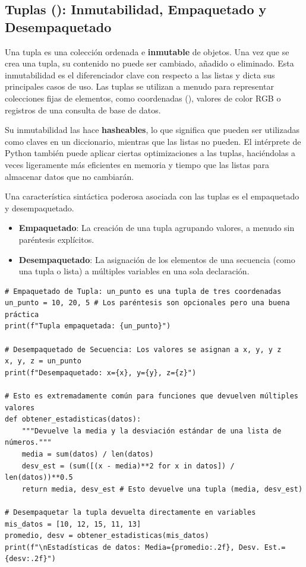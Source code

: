 \subsection{Tuplas (): Inmutabilidad, Empaquetado y Desempaquetado}
\label{subsec:tuples}
Una tupla es una colección ordenada e \textbf{inmutable} de objetos. Una vez que se crea una tupla, su contenido no puede ser cambiado, añadido o eliminado. Esta inmutabilidad es el diferenciador clave con respecto a las listas y dicta sus principales casos de uso. Las tuplas se utilizan a menudo para representar colecciones fijas de elementos, como coordenadas (), valores de color RGB o registros de una consulta de base de datos.

Su inmutabilidad las hace \textbf{hasheables}, lo que significa que pueden ser utilizadas como claves en un diccionario, mientras que las listas no pueden. El intérprete de Python también puede aplicar ciertas optimizaciones a las tuplas, haciéndolas a veces ligeramente más eficientes en memoria y tiempo que las listas para almacenar datos que no cambiarán.

Una característica sintáctica poderosa asociada con las tuplas es el empaquetado y desempaquetado.
\begin{itemize}
    \item \textbf{Empaquetado}: La creación de una tupla agrupando valores, a menudo sin paréntesis explícitos.
    \item \textbf{Desempaquetado}: La asignación de los elementos de una secuencia (como una tupla o lista) a múltiples variables en una sola declaración.
\end{itemize}

\begin{example}
\text{ }\begin{verbatim}
# Empaquetado de Tupla: un_punto es una tupla de tres coordenadas
un_punto = 10, 20, 5 # Los paréntesis son opcionales pero una buena práctica
print(f"Tupla empaquetada: {un_punto}")

# Desempaquetado de Secuencia: Los valores se asignan a x, y, y z
x, y, z = un_punto
print(f"Desempaquetado: x={x}, y={y}, z={z}")

# Esto es extremadamente común para funciones que devuelven múltiples valores
def obtener_estadisticas(datos):
    """Devuelve la media y la desviación estándar de una lista de números."""
    media = sum(datos) / len(datos)
    desv_est = (sum([(x - media)**2 for x in datos]) / len(datos))**0.5
    return media, desv_est # Esto devuelve una tupla (media, desv_est)

# Desempaquetar la tupla devuelta directamente en variables
mis_datos = [10, 12, 15, 11, 13]
promedio, desv = obtener_estadisticas(mis_datos)
print(f"\nEstadísticas de datos: Media={promedio:.2f}, Desv. Est.={desv:.2f}")
\end{verbatim}
\end{example}

